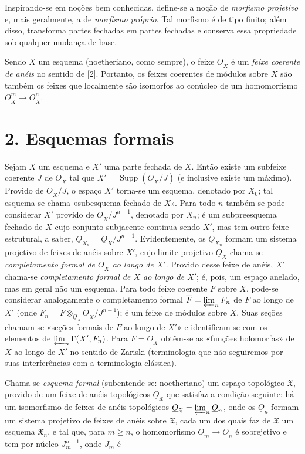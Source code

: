 \documentclass[11pt,twoside,openany]{book}
\numberwithin{equation}{section}
\newcommand{\src}[1]{%
  \phantomsection\hypertarget{src:#1}{}%
  \marginpar{\raggedleft\footnotesize\sffamily #1}%
}
\newcommand{\Osh}{\underline{O}}
\theoremstyle{plain}
\theoremstyle{definition}
\theoremstyle{remark}
\newcommand{\fsection}[2]{%
  \section*{#1. #2}%
  \addcontentsline{toc}{section}{#1. #2}%
}
\newcommand{\FgaUnitKey}{frontmatter}
\renewcommand{\src}[1]{%
  \phantomsection\hypertarget{src:\FgaUnitKey:#1}{}%
  \marginpar{\raggedleft\footnotesize\sffamily #1}%
}
\begin{document}
\src{195}
Inspirando-se em noções bem conhecidas, define-se a noção de
\emph{morfismo projetivo} e, mais geralmente, a de \emph{morfismo próprio}.
Tal morfismo é de tipo finito; além disso, transforma partes fechadas em partes
fechadas e conserva essa propriedade sob qualquer mudança de base.

Sendo $X$ um esquema (noetheriano, como sempre), o feixe $\Osh_X$ é um
\emph{feixe coerente de anéis} no sentido de [2]. Portanto, os feixes
coerentes de módulos sobre $X$ são também os feixes que localmente são
isomorfos ao conúcleo de um homomorfismo
$\Osh_X^{m}\longrightarrow\Osh_X^{n}$.

\fsection{2}{Esquemas formais}

Sejam $X$ um esquema e $X'$ uma parte fechada de $X$. Então existe um
subfeixe coerente $J$ de $\Osh_X$ tal que
$X'=\operatorname{Supp}(\Osh_X/J)$ (e inclusive existe um máximo). Provido de
$\Osh_X/J$, o espaço $X'$ torna-se um esquema, denotado por $X_0$;
tal esquema se chama «subesquema fechado de $X$». Para todo $n$ também se
pode considerar $X'$ provido de $\Osh_X/J^{n+1}$, denotado por $X_n$;
é um subpreesquema fechado de $X$ cujo conjunto subjacente continua sendo $X'$,
mas tem outro feixe estrutural, a saber,
$\Osh_{X_n}=\Osh_X/J^{n+1}$. Evidentemente, os $\Osh_{X_n}$ formam um sistema
projetivo de feixes de anéis sobre $X'$, cujo limite projetivo
$\overline{\Osh}_X$ chama-se \emph{completamento formal de $\Osh_X$ ao longo
de $X'$}. Provido desse feixe de anéis, $X'$ chama-se \emph{completamento
formal de $X$ ao longo de $X'$}; é, pois, um espaço anelado, mas em
geral não um esquema. Para todo feixe coerente $F$ sobre $X$, pode-se considerar
analogamente o completamento formal $\overline F=\varprojlim_n F_n$ de $F$ ao
longo de $X'$ (onde $F_n=F\otimes_{\Osh_X}\Osh_X/J^{n+1}$); é um feixe de
módulos sobre $\overline X$. Suas seções chamam-se «seções formais de $F$
ao longo de $X'$» e identificam-se com os elementos de
$\varprojlim_n\Gamma(X',F_n)$. Para $F=\Osh_X$ obtêm-se as «funções
holomorfas» de $X$ ao longo de $X'$ no sentido de Zariski (terminologia que
não seguiremos por suas interferências com a terminologia clássica).

Chama-se \emph{esquema formal} (subentende-se: noetheriano) um espaço
topológico $\mathfrak X$, provido de um feixe de anéis topológicos
$\Osh_{\mathfrak X}$ que satisfaz a condição seguinte: há um isomorfismo
de feixes de anéis topológicos
$\Osh_{\mathfrak X}=\varprojlim_n\Osh_n$, onde os $\Osh_n$ formam um sistema
projetivo de feixes de anéis sobre $\mathfrak X$, cada um dos quais faz
de $\mathfrak X$ um esquema $\mathfrak X_n$, e tal que, para $m\geq n$, o
homomorfismo $\Osh_m\longrightarrow\Osh_n$ é sobrejetivo e tem por núcleo
$J_m^{n+1}$, onde $J_m$ é
\end{document}
